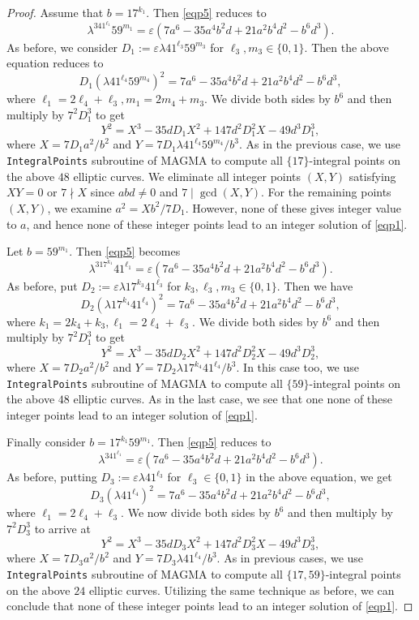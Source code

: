 \documentclass[10pt,a4paper]{amsart}
\begin{document}
\begin{proof}
Assume that $b=17^{k_1}$. Then \eqref{eqp5} reduces to
$$\lambda^341^{\ell_1}59^{m_1}=\varepsilon (7a^6-35a^4b^2d+21a^2b^4d^2-b^6d^3).$$
As before, we consider $D_1:=\varepsilon\lambda 41^{\ell_3}59^{m_3}$ for $ \ell_3, m_3\in\{0, 1\}$. Then the above equation reduces to
$$D_1(\lambda 41^{\ell_4}59^{m_4})^2=7a^6-35a^4b^2d+21a^2b^4d^2-b^6d^3,$$
 where $\ell_1=2\ell_4+\ell_3, m_1=2m_4+m_3$.
We divide both sides by $b^6$ and then multiply by $7^2D_1^3$ to get
$$Y^2=X^3-35dD_1X^2+147d^2D_1^2X-49d^3D_1^3,$$
where $X=7D_1a^2/b^2$ and $Y=7D_1\lambda 41^{\ell_4}59^{m_4}/b^3$.
As in the previous case, we use \texttt{IntegralPoints} subroutine of MAGMA to compute all $\{17\}$-integral points on the above $48$ elliptic curves. We eliminate all integer points $(X,Y)$ satisfying $XY=0$ or $7\nmid X$ since $abd\ne0$ and $7\mid \gcd(X,Y)$. For the remaining points $(X,Y)$, we examine $a^2=Xb^2/{7D_1}$. However, none of these gives integer value to $a$, and hence none of these integer points lead to an integer solution of \eqref{eqp1}. 

Let $b=59^{m_1}$. Then \eqref{eqp5} becomes
$$\lambda^317^{k_1}41^{\ell_1}=\varepsilon (7a^6-35a^4b^2d+21a^2b^4d^2-b^6d^3).$$
As before, put $D_2:=\varepsilon\lambda 17^{k_3}41^{\ell_3}$ for $k_3, \ell_3, m_3\in\{0, 1\}$. Then we have
$$D_2(\lambda 17^{k_4}41^{\ell_4})^2=7a^6-35a^4b^2d+21a^2b^4d^2-b^6d^3,$$
 where $k_1=2k_4+k_3, \ell_1=2\ell_4+\ell_3$.
We divide both sides by $b^6$ and then multiply by $7^2D_1^3$ to get
$$Y^2=X^3-35dD_2X^2+147d^2D_2^2X-49d^3D_2^3,$$
where $X=7D_2a^2/b^2$ and $Y=7D_2\lambda 17^{k_4}41^{\ell_4}/b^3$.
In this case too, we use \texttt{IntegralPoints} subroutine of MAGMA to compute all $\{59\}$-integral points on the above $48$ elliptic curves.  As in the last case, we see that one  none of these integer points lead to an integer solution of \eqref{eqp1}. 


Finally consider $b=17^{k_1}59^{m_1}$. Then \eqref{eqp5} reduces to
$$\lambda^341^{\ell_1}=\varepsilon (7a^6-35a^4b^2d+21a^2b^4d^2-b^6d^3).$$
As before, putting $D_3:=\varepsilon\lambda 41^{\ell_3}$ for $\ell_3\in\{0, 1\}$ in the above equation, we get 
$$D_3(\lambda 41^{\ell_4})^2=7a^6-35a^4b^2d+21a^2b^4d^2-b^6d^3,$$
 where $\ell_1=2\ell_4+\ell_3$.
We now divide both sides by $b^6$ and then multiply by $7^2D_3^3$ to arrive at 
$$Y^2=X^3-35dD_3X^2+147d^2D_3^2X-49d^3D_3^3,$$
where $X=7D_3a^2/b^2$ and $Y=7D_3\lambda 41^{\ell_4}/b^3$.
As in previous cases, we use \texttt{IntegralPoints} subroutine of MAGMA to compute all $\{17,59\}$-integral points on the above $24$ elliptic curves. Utilizing the same technique as before, we can conclude that none of these integer points lead to an integer solution of \eqref{eqp1}. 


\end{proof}
\end{document}

